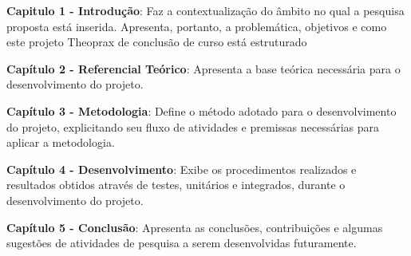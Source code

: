 \textbf{Capitulo 1 - Introdução}: Faz a contextualização do âmbito no qual a pesquisa proposta
está inserida. Apresenta, portanto, a problemática, objetivos e como este projeto Theoprax de conclusão de curso está estruturado


\textbf{Capítulo 2 - Referencial Teórico}: Apresenta a base teórica necessária para o desenvolvimento do projeto.

\textbf{Capítulo 3 - Metodologia}: Define o método adotado para o desenvolvimento do projeto, explicitando seu fluxo de atividades e premissas necessárias para aplicar a metodologia.

\textbf{Capítulo 4 - Desenvolvimento}: Exibe os procedimentos realizados e resultados obtidos através de testes, unitários e integrados, durante o desenvolvimento do projeto.

\textbf{Capítulo 5 - Conclusão}: Apresenta as conclusões, contribuições e algumas sugestões de atividades de pesquisa a serem desenvolvidas futuramente.


